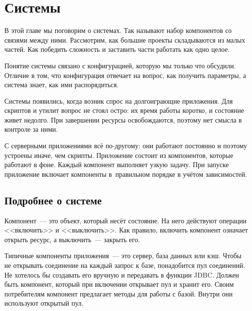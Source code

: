 \chapter{Системы}

\label{chapter-systems}


\begin{teaser}
В этой главе мы поговорим о системах. Так называют набор компонентов со связями
между ними. Рассмотрим, как большие проекты складываются из малых частей. Как
победить сложность и заставить части работать как одно целое.
\end{teaser}

Понятие системы связано с конфигурацией, которую мы только что обсудили. Отличие
в том, что конфигурация отвечает на вопрос, как получить параметры, а система
знает, как ими распорядиться.

Системы появились, когда возник спрос на долгоиграющие приложения. Для скриптов
и утилит вопрос не стоял остро: их время работы коротко, и состояние живет
недолго. При завершении ресурсы освобождаются, поэтому нет смысла в контроле за
ними.

С серверными приложениями всё по-дру\-го\-му: они работают постоянно и поэтому
устроены иначе, чем скрипты. Приложение состоит из компонентов, которые работают
в фоне. Каждый компонент выполняет узкую задачу. При запуске приложение включает
компоненты в~правильном порядке в учётом зависимостей.

\section{Подробнее о системе}


Компонент~--- это объект, который несёт состояние. На него действуют операции
<<включить>> и <<выключить>>. Как правило, включить компонент означает открыть
ресурс, а выключить~--- закрыть его.


Типичные компоненты приложения~--- это сервер, база данных или кэш. Чтобы не
открывать соединение на каждый запрос к базе, понадобится пул соединений. Не
хотелось бы создавать его вручную и передавать в функции JDBC. Должен быть
компонент, который при включении открывает пул и хранит его. Своим потребителям
компонент предлагает методы для работы с базой. Внутри они используют открытый
пул.


